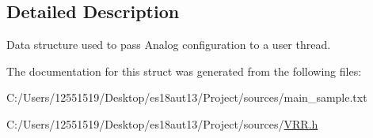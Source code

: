 \subsection{Detailed Description}
Data structure used to pass Analog configuration to a user thread. 



The documentation for this struct was generated from the following files\+:\begin{DoxyCompactItemize}
\item 
C\+:/\+Users/12551519/\+Desktop/es18aut13/\+Project/sources/main\+\_\+sample.\+txt\item 
C\+:/\+Users/12551519/\+Desktop/es18aut13/\+Project/sources/\hyperlink{_v_r_r_8h}{V\+R\+R.\+h}\end{DoxyCompactItemize}
